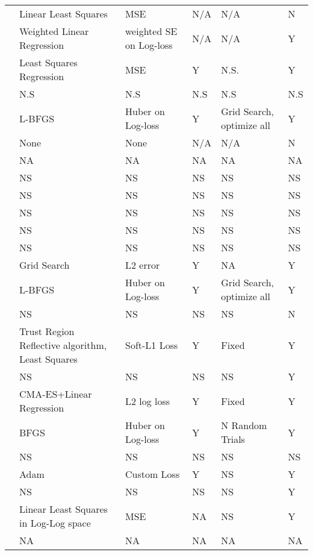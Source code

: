 \begin{table}[!h]
{\begin{tabular}{llllll}
\cite{cherti2023reproducible} & Linear Least Squares & MSE & N/A & N/A & N \\
\cite{porian2024resolving} & Weighted Linear Regression & weighted SE on Log-loss & N/A & N/A & Y \\
\cite{alabdulmohsin2022revisiting} & Least Squares Regression & MSE & Y & N.S. & Y \\
\cite{gao2024scalingevaluatingsparseautoencoders} & N.S & N.S & N.S & N.S & N.S \\
\cite{muennighoff2024scaling} & L-BFGS & Huber on Log-loss & Y & Grid Search, optimize all & Y \\
\cite{rae2021scaling} & None & None & N/A & N/A & N \\
\cite{shin2023scaling} & NA & NA & NA & NA & NA \\
\cite{hernandez2022scaling} & NS & NS & NS & NS & NS \\
\cite{filipovich2022scaling} & NS & NS & NS & NS & NS \\
\cite{neumann2022scaling} & NS & NS & NS & NS & NS \\
\cite{droppo2021scaling} & NS & NS & NS & NS & NS \\
\cite{henighan2020scaling} & NS & NS & NS & NS & NS \\
\cite{goyal2024scaling} & Grid Search & L2 error & Y & NA & Y \\
\cite{aghajanyan2023scaling} & L-BFGS & Huber on Log-loss & Y & Grid Search, optimize all & Y \\
\cite{kaplan2020scaling} & NS & NS & NS & NS & N \\
\cite{ghorbani2021scaling} & Trust Region Reflective algorithm, Least Squares & Soft-L1 Loss & Y & Fixed & Y \\
\cite{gao2023scaling} & NS & NS & NS & NS & Y \\
\cite{hilton2023scaling} & CMA-ES+Linear Regression & L2 log loss & Y & Fixed & Y \\
\cite{frantar2023scaling} & BFGS & Huber on Log-loss & Y & N Random Trials & Y \\
\cite{prato2021scaling} & NS & NS & NS & NS & NS \\
\cite{covert2024scaling} & Adam & Custom Loss & Y & NS & Y \\
\cite{hernandez2021scaling} & NS & NS & NS & NS & Y \\
\cite{ivgi2022scaling} & Linear Least Squares in Log-Log space & MSE & NA & NS & Y \\
\cite{tay2022scaling} & NA & NA & NA & NA & NA \\

\end{tabular}}
\end{table}
